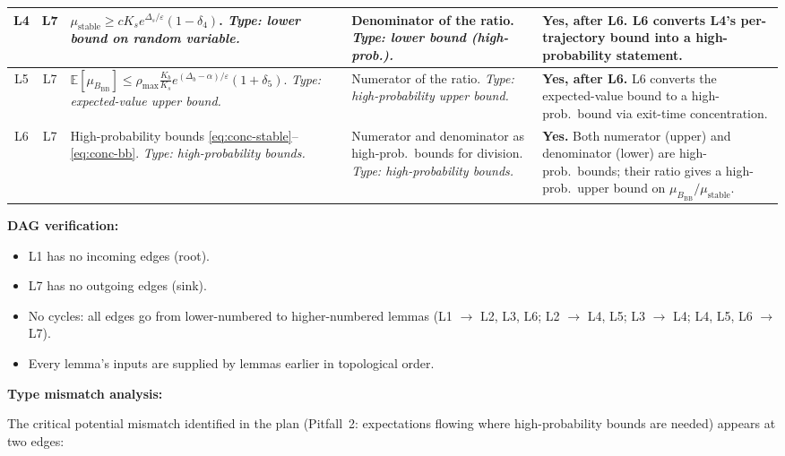 \documentclass[11pt]{article}
\newcommand{\eps}{\varepsilon}
\newcommand{\Ds}{\Delta_s}
\newcommand{\Db}{\Delta_b}
\newcommand{\BBB}{B_{\mathrm{BB}}}
\begin{document}
\begin{center}
\begin{tabular}{|c|c|p{4.2cm}|p{4.2cm}|p{3.0cm}|}
L4 & L7 &
  $\mu_{\mathrm{stable}} \geq c K_s e^{\Ds/\eps}(1-\delta_4)$.
  \emph{Type: lower bound on random variable.} &
  Denominator of the ratio.
  \emph{Type: lower bound (high-prob.).} &
  \textbf{Yes, after L6.} L6 converts L4's per-trajectory bound into a high-probability statement. \\
\hline

L5 & L7 &
  $\mathbb{E}[\mu_\BBB] \leq \rho_{\max} \frac{K_b}{K_s} e^{(\Db-\alpha)/\eps}(1+\delta_5)$.
  \emph{Type: expected-value upper bound.} &
  Numerator of the ratio.
  \emph{Type: high-probability upper bound.} &
  \textbf{Yes, after L6.} L6 converts the expected-value bound to a high-prob.\ bound via exit-time concentration. \\
\hline

L6 & L7 &
  High-probability bounds \eqref{eq:conc-stable}--\eqref{eq:conc-bb}.
  \emph{Type: high-probability bounds.} &
  Numerator and denominator as high-prob.\ bounds for division.
  \emph{Type: high-probability bounds.} &
  \textbf{Yes.} Both numerator (upper) and denominator (lower) are high-prob.\ bounds; their ratio gives a high-prob.\ upper bound on $\mu_\BBB / \mu_{\mathrm{stable}}$. \\
\hline
\end{tabular}
\end{center}

\medskip
\noindent
\textbf{DAG verification:}
\begin{itemize}
\item L1 has no incoming edges (root).
\item L7 has no outgoing edges (sink).
\item No cycles: all edges go from lower-numbered to higher-numbered
  lemmas (L1 $\to$ L2, L3, L6; L2 $\to$ L4, L5; L3 $\to$ L4;
  L4, L5, L6 $\to$ L7).
\item Every lemma's inputs are supplied by lemmas earlier in
  topological order.
\end{itemize}

\medskip
\noindent
\textbf{Type mismatch analysis:}

The critical potential mismatch identified in the plan (Pitfall~2:
expectations flowing where high-probability bounds are needed)
appears at two edges:
\end{document}
